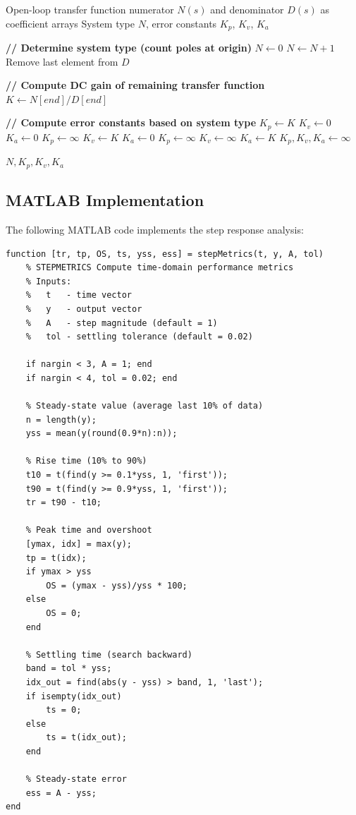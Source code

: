 \begin{algorithm}[htbp]
\caption{Compute System Type and Error Constants}
\label{alg:error_constants}
\begin{algorithmic}[1]
\REQUIRE Open-loop transfer function numerator $N(s)$ and denominator $D(s)$ as coefficient arrays
\ENSURE System type $N$, error constants $K_p$, $K_v$, $K_a$

\STATE \textbf{// Determine system type (count poles at origin)}
\STATE $N \leftarrow 0$
    \STATE $N \leftarrow N + 1$
    \STATE Remove last element from $D$
\ENDWHILE

\STATE \textbf{// Compute DC gain of remaining transfer function}
\STATE $K \leftarrow N[end] / D[end]$ 

\STATE \textbf{// Compute error constants based on system type}
    \STATE $K_p \leftarrow K$
    \STATE $K_v \leftarrow 0$
    \STATE $K_a \leftarrow 0$
    \STATE $K_p \leftarrow \infty$
    \STATE $K_v \leftarrow K$
    \STATE $K_a \leftarrow 0$
    \STATE $K_p \leftarrow \infty$
    \STATE $K_v \leftarrow \infty$
    \STATE $K_a \leftarrow K$
\ELSE
    \STATE $K_p, K_v, K_a \leftarrow \infty$
\ENDIF

\RETURN $N, K_p, K_v, K_a$
\end{algorithmic}
\end{algorithm}

\subsection{MATLAB Implementation}

The following MATLAB code implements the step response analysis:

\begin{verbatim}
function [tr, tp, OS, ts, yss, ess] = stepMetrics(t, y, A, tol)
    % STEPMETRICS Compute time-domain performance metrics
    % Inputs:
    %   t   - time vector
    %   y   - output vector
    %   A   - step magnitude (default = 1)
    %   tol - settling tolerance (default = 0.02)

    if nargin < 3, A = 1; end
    if nargin < 4, tol = 0.02; end

    % Steady-state value (average last 10% of data)
    n = length(y);
    yss = mean(y(round(0.9*n):n));

    % Rise time (10% to 90%)
    t10 = t(find(y >= 0.1*yss, 1, 'first'));
    t90 = t(find(y >= 0.9*yss, 1, 'first'));
    tr = t90 - t10;

    % Peak time and overshoot
    [ymax, idx] = max(y);
    tp = t(idx);
    if ymax > yss
        OS = (ymax - yss)/yss * 100;
    else
        OS = 0;
    end

    % Settling time (search backward)
    band = tol * yss;
    idx_out = find(abs(y - yss) > band, 1, 'last');
    if isempty(idx_out)
        ts = 0;
    else
        ts = t(idx_out);
    end

    % Steady-state error
    ess = A - yss;
end
\end{verbatim}

